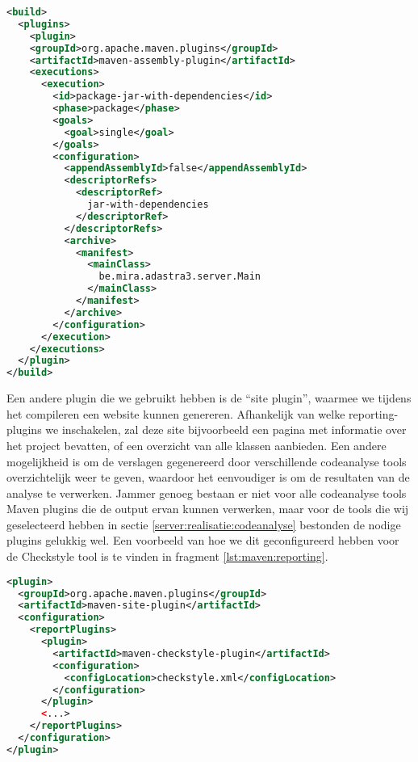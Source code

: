 \begin{lstlisting}[language=XML, float, caption=Gebruik van Maven modules om een executable te compileren., label=lst:fatjar]
<build>
  <plugins>
    <plugin>
    <groupId>org.apache.maven.plugins</groupId>
    <artifactId>maven-assembly-plugin</artifactId>
    <executions>
      <execution>
        <id>package-jar-with-dependencies</id>
        <phase>package</phase>
        <goals>
          <goal>single</goal>
        </goals>
        <configuration>
          <appendAssemblyId>false</appendAssemblyId>
          <descriptorRefs>
            <descriptorRef>
              jar-with-dependencies
            </descriptorRef>
          </descriptorRefs>
          <archive>
            <manifest>
              <mainClass>
                be.mira.adastra3.server.Main
              </mainClass>
            </manifest>
          </archive>
        </configuration>
      </execution>
    </executions>
  </plugin>
</build>
\end{lstlisting}

Een andere plugin die we gebruikt hebben is de ``site plugin'', waarmee we tijdens het compileren een website kunnen genereren. Afhankelijk van welke reporting-plugins we inschakelen, zal deze site bijvoorbeeld een pagina met informatie over het project bevatten, of een overzicht van alle klassen aanbieden. Een andere mogelijkheid is om de verslagen gegenereerd door verschillende codeanalyse tools overzichtelijk weer te geven, waardoor het eenvoudiger is om de resultaten van de analyse te verwerken. Jammer genoeg bestaan er niet voor alle codeanalyse tools Maven plugins die de output ervan kunnen verwerken, maar voor de tools die wij geselecteerd hebben in sectie \ref{server:realisatie:codeanalyse} bestonden de nodige plugins gelukkig wel. Een voorbeeld van hoe we dit geconfigureerd hebben voor de Checkstyle tool is te vinden in fragment \ref{lst:maven:reporting}.

\begin{lstlisting}[language=XML, float, caption=Configuratie van de Maven site plugin voor het genereren van Checkstyle reports., label=lst:maven:reporting]
<plugin>
  <groupId>org.apache.maven.plugins</groupId>
  <artifactId>maven-site-plugin</artifactId>
  <configuration>
    <reportPlugins>
      <plugin>
        <artifactId>maven-checkstyle-plugin</artifactId>
        <configuration>
          <configLocation>checkstyle.xml</configLocation>
        </configuration>
      </plugin>
      <...>
    </reportPlugins>
  </configuration>
</plugin>
\end{lstlisting}

